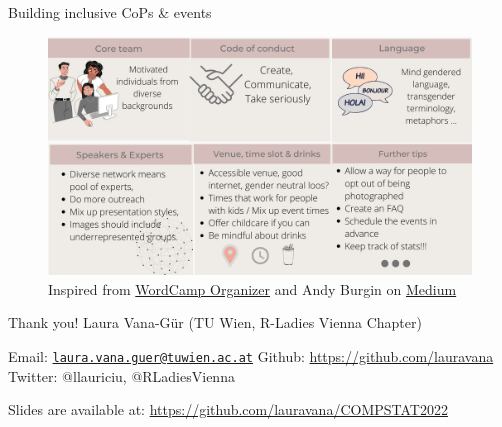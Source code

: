 \documentclass[
  ignorenonframetext,
]{beamer}
\begin{document}
\begin{frame}{Building inclusive CoPs \& events}
\protect\hypertarget{building-inclusive-cops-events}{}
\begin{figure}
\centering
\includegraphics[width=1\textwidth,height=\textheight]{figs/2.png}
\caption{Inspired from
\href{https://make.wordpress.org/community/handbook/wordcamp-organizer/}{WordCamp
Organizer} and Andy Burgin on
\href{https://medium.com/@andyburgindevops/building-an-inclusive-and-diverse-tech-meetup-50efc5cf81e1}{Medium}}
\end{figure}
\end{frame}

\begin{frame}{Thank you!}
\protect\hypertarget{thank-you}{}
Laura Vana-Gür (TU Wien, R-Ladies Vienna Chapter)

Email:
\href{mailto:laura.vana.guer@tuwien.ac.at}{\nolinkurl{laura.vana.guer@tuwien.ac.at}}
\newline Github: \url{https://github.com/lauravana} \newline Twitter:
@llauriciu, @RLadiesVienna

Slides are available at: \url{https://github.com/lauravana/COMPSTAT2022}
\end{frame}
\end{document}
